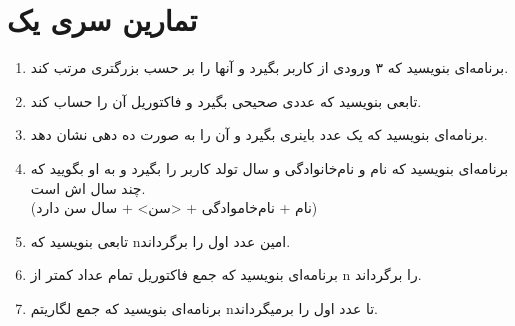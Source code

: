 \documentclass[12pt,a4paper]{article}
\title{}
\author{}
\date{}
\newcommand{\ن}{‌}
\begin{document}
	\maketitle{}
	\section{تمارین سری یک}
	\begin{enumerate}
	\item
برنامه‌ای بنویسید که ۳ ورودی از کاربر بگیرد و آنها را بر حسب بزرگتری مرتب کند.
	\item
	تابعی بنویسید که عددی صحیحی بگیرد و فاکتوریل آن را حساب کند.
	\item 
	برنامه‌ای بنویسید که یک عدد باینری بگیرد و آن را به صورت ده دهی نشان دهد.
	\item
	برنامه‌ای بنویسید که نام و نام‌خانوادگی و سال تولد کاربر را بگیرد و به او بگویید که چند سال اش است.\\ (نام + نام‌خاموادگی + <سن> + سال سن دارد)
	\item 
	تابعی بنویسید که nامین عدد اول را برگرداند.
	\item
	برنامه‌ای بنویسید که جمع فاکتوریل تمام عداد کمتر از n را برگرداند.
	\item 
	برنامه‌ای بنویسید که جمع لگاریتم nتا عدد اول را برمیگرداند. 
	\end{enumerate}
\end{document}
